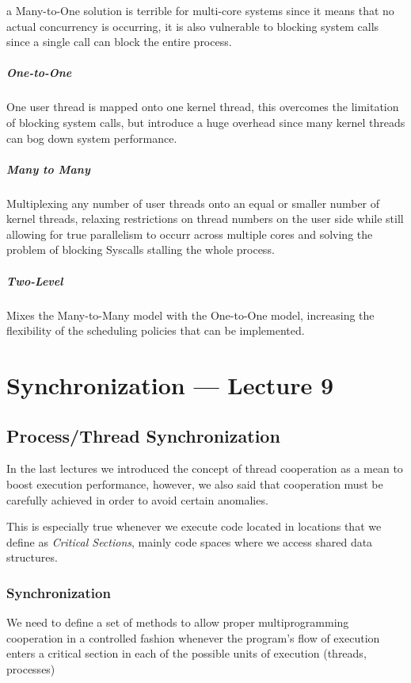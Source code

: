 \documentclass[openright, twoside]{report}
\theoremstyle{definition}
\theoremstyle{example}
\begin{document}
	a Many-to-One solution is terrible for multi-core systems since it means that 
	no actual concurrency is occurring, it is also vulnerable to blocking system calls since 
	a single call can block the entire process.

	\paragraph{One-to-One}
	One user thread is mapped onto one kernel thread, this overcomes the limitation of 
	blocking system calls, but introduce a huge overhead since many kernel threads can 
	bog down system performance.

	\paragraph{Many to Many}
	Multiplexing any number of user threads onto an equal or smaller number of kernel threads,
	relaxing restrictions on thread numbers on the user side while still allowing for true parallelism
	to occurr across multiple cores and solving the problem of blocking Syscalls stalling the whole process.

	\paragraph{Two-Level}
	Mixes the Many-to-Many model with the One-to-One model, increasing the flexibility of 
	the scheduling policies that can be implemented.

		
\chapter{Synchronization --- Lecture 9}
	\section{Process/Thread Synchronization}
	In the last lectures we introduced the concept of thread cooperation as a mean 
	to boost execution performance, however, we also said that cooperation must be 
	carefully achieved in order to avoid certain anomalies.

	This is especially true whenever we execute code located in locations that we 
	define as \emph{Critical Sections}, mainly code spaces where we access 
	shared data structures.

		\subsection{Synchronization}
		We need to define a set of methods to allow proper multiprogramming cooperation 
		in a controlled fashion whenever the program's flow of execution enters a 
		critical section in each of the possible units of execution (threads, processes)
		
\end{document}
